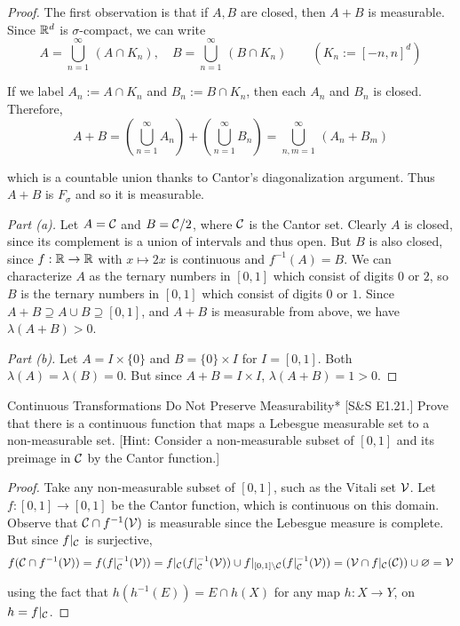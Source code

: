 \begin{proof}
    The first observation is that if $A,B$ are closed, then $A+B$ is measurable. Since $\mathbb{R}^d$ is $\sigma$-compact, we can write 
    $$
    A = \bigcup_{n=1}^\infty \, (A \cap K_n), \quad B = \bigcup_{n=1}^\infty \, (B \cap K_n) \qquad (K_n := [-n, n]^d)
    $$

    If we label $A_n := A \cap K_n$ and $B_n := B \cap K_n$, then each $A_n$ and $B_n$ is closed. Therefore, 
    $$
    A + B
    = \left( \bigcup_{n=1}^\infty A_n \right) + \left( \bigcup_{n=1}^\infty B_n \right)
    = \bigcup_{n, m=1}^\infty \, (A_n + B_m)
    $$

    which is a countable union thanks to Cantor's diagonalization argument. Thus $A+B$ is $F_\sigma$ and so it is measurable. 

    \textit{Part (a).} Let $A = \mathcal{C}$ and $B = \mathcal{C} / 2$, where $\mathcal{C}$ is the Cantor set. Clearly $A$ is closed, since its complement is a union of intervals and thus open. But $B$ is also closed, since $f : \mathbb{R} \to \mathbb{R}$ with $x \mapsto 2x$ is continuous and $f^{-1}(A) = B$. We can characterize $A$ as the ternary numbers in $[0,1]$ which consist of digits $0$ or $2$, so $B$ is the ternary numbers in $[0,1]$ which consist of digits $0$ or $1$. Since $A+B \supseteq A \cup B \supseteq [0,1]$, and $A+B$ is measurable from above, we have $\lambda(A+B) > 0$. 

    \textit{Part (b).} Let $A = I \times \{0\}$ and $B = \{0\} \times I$ for $I = [0,1]$. Both $\lambda(A) = \lambda(B) = 0$. But since $A+B = I \times I$, $\lambda(A+B) = 1 > 0$. 
\end{proof}

\begin{problem}{Continuous Transformations Do Not Preserve Measurability}*
    [S\&S E1.21.] Prove that there is a continuous function that maps a Lebesgue measurable set to a non-measurable set. [Hint: Consider a non-measurable subset of $[0,1]$ and its preimage in $\mathcal{C}$ by the Cantor function.]
\end{problem}

\begin{proof}
    Take any non-measurable subset of $[0,1]$, such as the Vitali set $\mathcal{V}$. Let $f : [0,1] \to [0,1]$ be the Cantor function, which is continuous on this domain. Observe that $\mathcal{C} \cap f^{-1}(\mathcal{V})$ is measurable since the Lebesgue measure is complete. But since $f \vert_{\mathcal{C}}$ is surjective, 
    $$
    f(\mathcal{C} \cap f^{-1}(\mathcal{V}))
    = f(f\vert_{\mathcal{C}}^{-1}(\mathcal{V}))
    = f\vert_{\mathcal{C}}(f\vert_{\mathcal{C}}^{-1}(\mathcal{V})) \cup f\vert_{[0,1] \setminus \mathcal{C}} (f\vert_{\mathcal{C}}^{-1}(\mathcal{V}))
    = (\mathcal{V} \cap f\vert_{\mathcal{C}}(\mathcal{C})) \cup \varnothing
     = \mathcal{V}
    $$

    using the fact that $h(h^{-1}(E)) = E \cap h(X)$ for any map $h : X \to Y$, on $h = f\vert_{\mathcal{C}}$. 
\end{proof}

